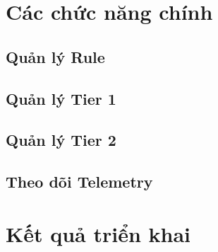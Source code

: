 \documentclass[../DoAn.tex]{subfiles}
\begin{document}
\section{Các chức năng chính}

\subsection{Quản lý Rule}

\subsection{Quản lý Tier 1}

\subsection{Quản lý Tier 2}

\subsection{Theo dõi Telemetry}

\section{Kết quả triển khai}
\end{document}
